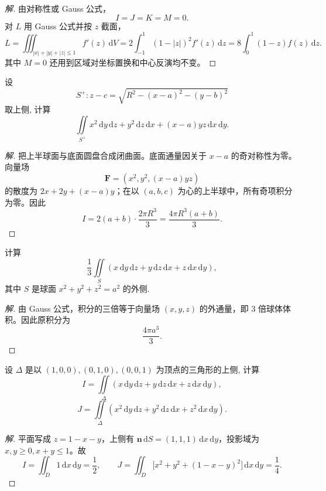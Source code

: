 \documentclass[../../数学分析培优讲义(答案版).tex]{subfiles}
\begin{document}
\begin{proof}[解]
由对称性或 Gauss 公式，
\[
I=J=K=M=0.
\]
对 $L$ 用 Gauss 公式并按 $z$ 截面，
\[
L=\iiint_{|x|+|y|+|z|\leq1}f'(z)\,\mathrm{d}V
=2\int_{-1}^1(1-|z|)^2f'(z)\,\mathrm{d}z
=8\int_0^1(1-z)f(z)\,\mathrm{d}z.
\]
其中 $M=0$ 还用到区域对坐标置换和中心反演均不变。
\end{proof}

\begin{example}
设
\[
    S^+:z-c=\sqrt{R^2-(x-a)^2-(y-b)^2}
\]
取上侧, 计算
\[
    \iint\limits_{S^+}x^2\,\mathrm{d}y\,\mathrm{d}z+y^2\,\mathrm{d}z\,\mathrm{d}x+(x-a)y z\,\mathrm{d}x\,\mathrm{d}y.
\]
\end{example}

\begin{proof}[解]
把上半球面与底面圆盘合成闭曲面。底面通量因关于 $x-a$ 的奇对称性为零。向量场
\[
\bm F=(x^2,y^2,(x-a)yz)
\]
的散度为 $2x+2y+(x-a)y$；在以 $(a,b,c)$ 为心的上半球中，所有奇项积分为零。因此
\[
I=2(a+b)\cdot\dfrac{2\pi R^3}{3}=\dfrac{4\pi R^3(a+b)}{3}.
\]
\end{proof}

\begin{example}
计算
\[
    \dfrac{1}{3}\iint\limits_S(x\,\mathrm{d}y\,\mathrm{d}z+y\,\mathrm{d}z\,\mathrm{d}x+z\,\mathrm{d}x\,\mathrm{d}y),
\]
其中 $S$ 是球面 $x^2+y^2+z^2=a^2$ 的外侧.
\end{example}

\begin{proof}[解]
由 Gauss 公式，积分的三倍等于向量场 $(x,y,z)$ 的外通量，即 $3$ 倍球体体积。因此原积分为
\[
\dfrac{4\pi a^3}{3}.
\]
\end{proof}

\begin{example}
设 $\Delta$ 是以 $(1,0,0),(0,1,0),(0,0,1)$ 为顶点的三角形的上侧, 计算
\[
    I=\iint\limits_\Delta(x\,\mathrm{d}y\,\mathrm{d}z+y\,\mathrm{d}z\,\mathrm{d}x+z\,\mathrm{d}x\,\mathrm{d}y),
\]
\[
    J=\iint\limits_\Delta(x^2\,\mathrm{d}y\,\mathrm{d}z+y^2\,\mathrm{d}z\,\mathrm{d}x+z^2\,\mathrm{d}x\,\mathrm{d}y).
\]
\end{example}

\begin{proof}[解]
平面写成 $z=1-x-y$，上侧有
$\bm n\,\mathrm{d}S=(1,1,1)\,\mathrm{d}x\,\mathrm{d}y$，投影域为 $x,y\geq0,x+y\leq1$。故
\[
I=\iint_D1\,\mathrm{d}x\,\mathrm{d}y=\dfrac{1}{2},
\qquad
J=\iint_D\bigl[x^2+y^2+(1-x-y)^2\bigr]\,\mathrm{d}x\,\mathrm{d}y=\dfrac{1}{4}.
\]
\end{proof}
\end{document}
